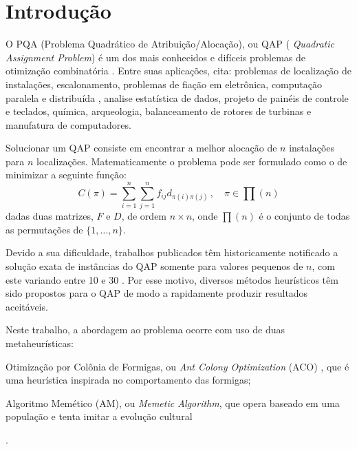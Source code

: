 \section{Introdução}

O PQA (Problema Quadrático de Atribuição/Alocação), ou QAP (
\textit{Quadratic Assignment Problem}) \cite{qap-origin} é um dos
mais conhecidos e difíceis problemas de otimização combinatória
\cite{Maniezzo98exactand}. Entre suas aplicações, \cite{QAPBOOK} cita:
problemas de localização de instalações, escalonamento, problemas de
fiação em eletrônica, computação paralela e distribuída \cite{22},
analise estatística de dados, projeto de painéis de controle e teclados,
química, arqueologia, balanceamento de rotores de turbinas e
manufatura de computadores.


Solucionar um QAP consiste em encontrar a melhor alocação de $n$
instalações para $n$ localizações. Matematicamente o problema pode ser
formulado como o de minimizar a seguinte função:
\begin{equation}\label{calc-custo}
C(\pi) = \sum_{i = 1}^{n} \sum_{j = 1}^{n} f_{ij} d_{\pi(i)
   \pi(j)} \, , \quad \pi \in \prod(n)
\end{equation}
dadas duas matrizes, $F$ e $D$, de ordem $n \times n$, onde $\prod(n)$ é o
conjunto de todas as permutações de $\{1, \ldots , n\}$.

Devido a sua dificuldade, trabalhos publicados têm historicamente
notificado a solução exata de instâncias do QAP somente para valores
pequenos de $n$, com este variando entre
10 \cite{qap-origin} e 30 \cite{stutzle04}.
Por esse motivo, diversos métodos heurísticos têm sido propostos
para o QAP de modo a rapidamente produzir resultados aceitáveis.

Neste trabalho, a abordagem ao problema ocorre com uso de duas
metaheurísticas: \begin{inparaenum}[(1)] \item Otimização por Colônia
  de Formigas, ou {\it Ant Colony Optimization} (ACO) \cite{aco-origin}, que é
uma heurística inspirada no comportamento das formigas;
\item Algoritmo Memético (AM), ou \textit{Memetic Algorithm}\cite{moscato1},
que opera baseado em uma população e tenta imitar a evolução
cultural\end{inparaenum}.

